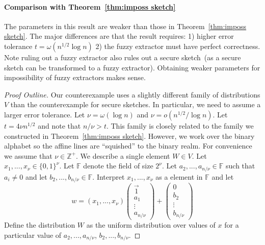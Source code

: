 \documentclass[11pt]{article}
\newcommand{\thref}[1]{\mbox{Theorem~\ref{#1}}}
\newcommand{\zo}{\ensuremath{\{0, 1\}}}
\begin{document}
\paragraph{Comparison with \thref{thm:imposs sketch}} The parameters in this result are weaker than those in \thref{thm:imposs sketch}.  The major differences are that the result requires: 1) higher error tolerance $t= \omega(n^{1/2}\log n)$ 2) the fuzzy extractor must have perfect correctness.  Note ruling out a fuzzy extractor also rules out a secure sketch~(as a secure sketch can be transformed to a fuzzy extractor).  Obtaining weaker parameters for impossibility of fuzzy extractors makes sense.
\begin{proof}[Proof Outline]
Our counterexample uses a slightly different family of distributions $V$ than the counterexample for secure sketches.  In particular, we need to assume a larger error tolerance.  Let $\nu = \omega(\log n)$ and $\nu = o(n^{1/2}/\log n)$.  Let $t=4\nu n^{1/2}$ and note that $n/\nu >t$.  This family is closely related to the family we constructed in \thref{thm:imposs sketch}.  However, we work over the binary alphabet so the affine lines are ``squished'' to the binary realm.  For convenience we assume that $\nu\in\mathbb{Z}^+$.  We describe a single element $W\in V$. Let $x_1,..., x_\nu \in \zo^\nu$.  Let $\mathbb{F}$ denote the field of size $2^{\nu}$.  Let $a_2,..., a_{n/\nu}\in\mathbb{F}$ such that $a_i\neq 0$ and let $b_2,..., b_{n/\nu}\in\mathbb{F}$.  
Interpret $x_1,..., x_{\nu}$ as a element in $\mathbb{F}$ and let 
\[w = (x_1,..., x_{\nu})  \begin{pmatrix} \vec{1} \\a_1  \\ \vdots \\ a_{n/\nu} \end{pmatrix} + \begin{pmatrix} 0  \\ 
b_2\\ \vdots \\ b_{n/\nu} \end{pmatrix} 
\]
Define the distribution $W$ as the uniform distribution over values of $x$ for a particular value of $a_2,..., a_{n/\nu}$, $b_2,..., b_{n/\nu}$.  


\end{proof}
\end{document}
